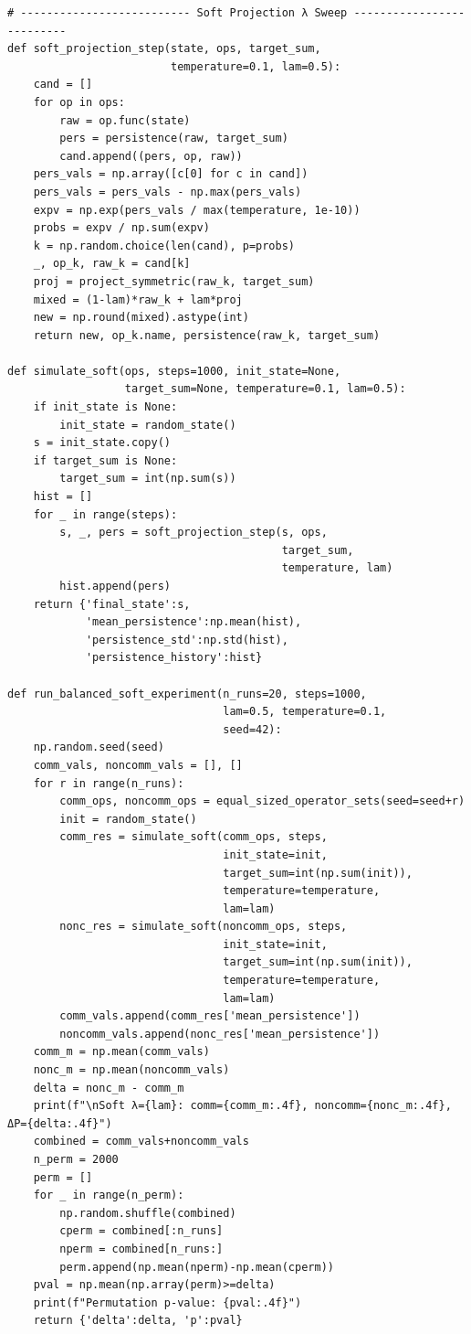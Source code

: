 \documentclass[11pt]{article}
\begin{document}
\begin{lstlisting}
# -------------------------- Soft Projection λ Sweep --------------------------
def soft_projection_step(state, ops, target_sum,
                         temperature=0.1, lam=0.5):
    cand = []
    for op in ops:
        raw = op.func(state)
        pers = persistence(raw, target_sum)
        cand.append((pers, op, raw))
    pers_vals = np.array([c[0] for c in cand])
    pers_vals = pers_vals - np.max(pers_vals)
    expv = np.exp(pers_vals / max(temperature, 1e-10))
    probs = expv / np.sum(expv)
    k = np.random.choice(len(cand), p=probs)
    _, op_k, raw_k = cand[k]
    proj = project_symmetric(raw_k, target_sum)
    mixed = (1-lam)*raw_k + lam*proj
    new = np.round(mixed).astype(int)
    return new, op_k.name, persistence(raw_k, target_sum)

def simulate_soft(ops, steps=1000, init_state=None,
                  target_sum=None, temperature=0.1, lam=0.5):
    if init_state is None:
        init_state = random_state()
    s = init_state.copy()
    if target_sum is None:
        target_sum = int(np.sum(s))
    hist = []
    for _ in range(steps):
        s, _, pers = soft_projection_step(s, ops,
                                          target_sum,
                                          temperature, lam)
        hist.append(pers)
    return {'final_state':s,
            'mean_persistence':np.mean(hist),
            'persistence_std':np.std(hist),
            'persistence_history':hist}

def run_balanced_soft_experiment(n_runs=20, steps=1000,
                                 lam=0.5, temperature=0.1,
                                 seed=42):
    np.random.seed(seed)
    comm_vals, noncomm_vals = [], []
    for r in range(n_runs):
        comm_ops, noncomm_ops = equal_sized_operator_sets(seed=seed+r)
        init = random_state()
        comm_res = simulate_soft(comm_ops, steps,
                                 init_state=init,
                                 target_sum=int(np.sum(init)),
                                 temperature=temperature,
                                 lam=lam)
        nonc_res = simulate_soft(noncomm_ops, steps,
                                 init_state=init,
                                 target_sum=int(np.sum(init)),
                                 temperature=temperature,
                                 lam=lam)
        comm_vals.append(comm_res['mean_persistence'])
        noncomm_vals.append(nonc_res['mean_persistence'])
    comm_m = np.mean(comm_vals)
    nonc_m = np.mean(noncomm_vals)
    delta = nonc_m - comm_m
    print(f"\nSoft λ={lam}: comm={comm_m:.4f}, noncomm={nonc_m:.4f}, ΔP={delta:.4f}")
    combined = comm_vals+noncomm_vals
    n_perm = 2000
    perm = []
    for _ in range(n_perm):
        np.random.shuffle(combined)
        cperm = combined[:n_runs]
        nperm = combined[n_runs:]
        perm.append(np.mean(nperm)-np.mean(cperm))
    pval = np.mean(np.array(perm)>=delta)
    print(f"Permutation p‑value: {pval:.4f}")
    return {'delta':delta, 'p':pval}


\end{lstlisting}
\end{document}
